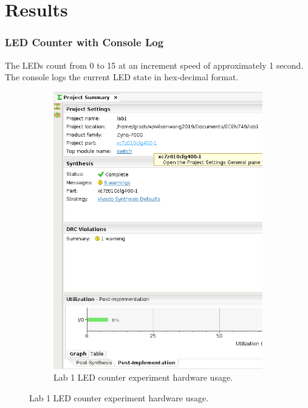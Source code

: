 \documentclass[11pt,letterpaper,titlepage]{article}
\begin{document}
\newpage

\part{Results}

\section{LED Counter with Console Log}

The LEDs count from 0 to 15 at an increment speed of approximately 1 second. The console logs the current LED state in hex-decimal format.

\begin{figure}[h!]
\centering
    \begin{subfigure}{0.49\textwidth}
        \includegraphics[width=\linewidth]{Lab1_Hardware_Usage.png} 
        \caption{Lab 1 LED counter experiment hardware usage.}
    \end{subfigure}

\end{figure}
\end{document}
